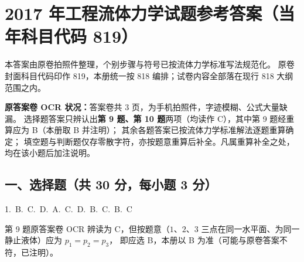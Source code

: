 \chapter{2017 年工程流体力学试题参考答案（当年科目代码 819）}

\begin{tishi}
本答案由原卷拍照件整理，个别步骤与符号已按流体力学标准写法规范化。
原卷封面科目代码印作 819，本册统一按 818 编排；试卷内容全部落在现行 818 大纲范围之内。

\textbf{原答案卷 OCR 状况：}答案卷共 3 页，为手机拍照件，字迹模糊、公式大量缺漏。
选择题答案只辨认出\textbf{第 9 题、第 10 题}两项（均读作 C），其中第 9 题经重算应为 B（本册取 B 并注明）；
其余各题答案已按流体力学标准解法逐题重算确定；
填空题与判断题仅存零散字符，亦按题意重算后补全。凡属重算补全之处，均在该小题后加注说明。
\end{tishi}

\section{一、选择题（共 30 分，每小题 3 分）}

\begin{center}
1.~B.~C.~D.~A.~C.~D.~B.~C.~B.~C
\end{center}

\begin{tishi}
第 9 题原答案卷 OCR 辨读为 C，但按题意（$1$、$2$、$3$ 三点在同一水平面、为同一静止液体）应为 $p_1=p_2=p_3$，
即应选 B，本册以 B 为准（可能与原卷答案不符，已注明）。
\end{tishi}

